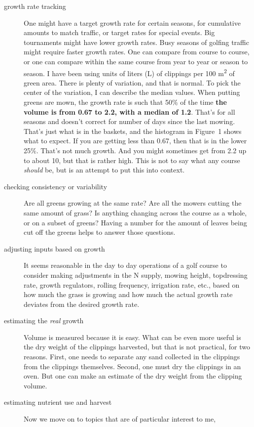\documentclass[12pt,b5,]{tufte-book}
\begin{document}
\begin{description}
\item[growth rate tracking]
One might have a target growth rate for certain seasons, for
cumulative amounts to match traffic, or target rates for
special events. Big tournaments might have lower growth rates. Busy
seasons of golfing traffic might require faster growth rates. One
can compare from course to course, or one can compare within the
same course from year to year or season to season. I have been using
units of liters (L) of clippings per 100 m\textsuperscript{2} of green area. There
is plenty of variation, and that is normal. To pick the center of
the variation, I can describe the median values. When putting greens
are mown, the growth rate is such that 50\% of the time \textbf{the volume
is from 0.67 to 2.2, with a median of 1.2}. That's for all seasons
and doesn't correct for number of days since the last mowing. That's
just what is in the baskets, and the histogram in
Figure~1 shows what to expect. If you are getting
less than 0.67, then that is in the lower 25\%. That's not
much growth. And you might sometimes get from 2.2 up to about 10,
but that is rather high. This is not to say what any course \emph{should}
be, but is an attempt to put this into context.
\item[checking consistency or variability]
Are all greens growing at the same rate? Are all the mowers cutting
the same amount of grass? Is anything changing across the course as
a whole, or on a subset of greens? Having a number for the amount of
leaves being cut off the greens helps to answer those questions.
\item[adjusting inputs based on growth]
It seems reasonable in the day to day operations of a golf course to
consider making adjustments in the N supply, mowing height,
topdressing rate, growth regulators, rolling frequency, irrigation
rate, etc., based on how much the grass is growing and how much the
actual growth rate deviates from the desired growth rate.
\item[estimating the \emph{real} growth]
Volume is measured because it is easy. What can be even more useful
is the dry weight of the clippings harvested, but that is not
practical, for two reasons. First, one needs to separate any sand
collected in the clippings from the clippings themselves. Second,
one must dry the clippings in an oven. But one can make an estimate
of the dry weight from the clipping volume.
\item[estimating nutrient use and harvest]
Now we move on to topics that are of particular interest to me,

\end{description}
\end{document}
